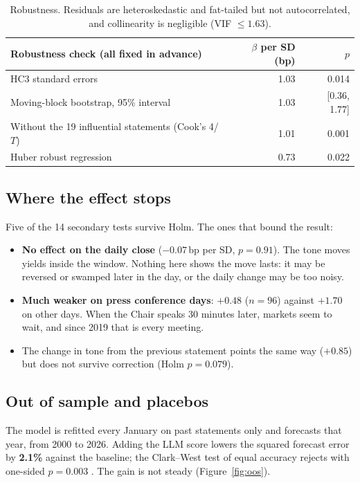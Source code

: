 \documentclass[11pt,a4paper]{article}
\newcommand{\sfb}[1]{{\sffamily\bfseries #1}}
\newcommand{\bp}{\,bp}
\begin{document}
\begin{table}[H]
\centering\small
\begin{tabular}{lrr}
\toprule
Robustness check (all fixed in advance) & $\beta$ per SD (bp) & $p$ \\
\midrule
HC3 standard errors                                 & 1.03 & 0.014 \\
Moving-block bootstrap, 95\% interval               & 1.03 & [0.36, 1.77] \\
Without the 19 influential statements (Cook's 4/$T$) & 1.01 & 0.001 \\
Huber robust regression                             & 0.73 & 0.022 \\
\bottomrule
\end{tabular}
\caption{Robustness. Residuals are heteroskedastic and fat-tailed but not autocorrelated, and
collinearity is negligible (VIF $\le 1.63$).}
\end{table}

\subsection{Where the effect stops}

Five of the 14 secondary tests survive Holm. The ones that bound the result:
\begin{itemize}
\item \sfb{No effect on the daily close} ($-0.07$\bp{} per SD, $p = 0.91$). The tone moves
  yields inside the window. Nothing here shows the move lasts: it may be reversed or swamped
  later in the day, or the daily change may be too noisy.
\item \sfb{Much weaker on press conference days}: $+0.48$ ($n = 96$) against $+1.70$ on other
  days. When the Chair speaks 30 minutes later, markets seem to wait, and since 2019 that is
  every meeting.
\item The change in tone from the previous statement points the same way ($+0.85$) but does
  not survive correction (Holm $p = 0.079$).
\end{itemize}

\subsection{Out of sample and placebos}

The model is refitted every January on past statements only and forecasts that year, from
2000 to 2026. Adding the LLM score lowers the squared forecast error by \sfb{2.1\%} against
the baseline; the Clark--West test of equal accuracy rejects with one-sided $p = 0.003$
\citep{clarkwest2007}. The gain is not steady (Figure~\ref{fig:oos}).
\end{document}
